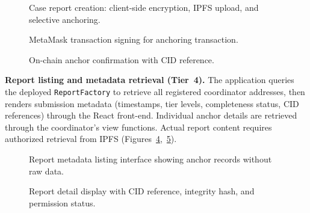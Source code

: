 \documentclass[AMA,LATO1COL]{WileyNJD-v2}
\begin{document}
\begin{figure}[!ht]
\centering
{}
\caption{Case report creation: client-side encryption, IPFS upload, and selective anchoring.}\label{fig:create1}
\end{figure}

\begin{figure}[!ht]
\centering
{}
\caption{MetaMask transaction signing for anchoring transaction.}\label{fig:create2}
\end{figure}

\begin{figure}[!ht]
\centering
{}
\caption{On-chain anchor confirmation with CID reference.}\label{fig:create3}
\end{figure}

\textbf{Report listing and metadata retrieval (Tier~4).} The application queries the deployed \texttt{ReportFactory} to retrieve all registered coordinator addresses, then renders submission metadata (timestamps, tier levels, completeness status, CID references) through the React front-end. Individual anchor details are retrieved through the coordinator's view functions. Actual report content requires authorized retrieval from IPFS (Figures~\ref{fig:list},~\ref{fig:detail}).

\begin{figure}[!ht]
\centering
{}
\caption{Report metadata listing interface showing anchor records without raw data.}\label{fig:list}
\end{figure}

\begin{figure}[!ht]
\centering
{}
\caption{Report detail display with CID reference, integrity hash, and permission status.}\label{fig:detail}
\end{figure}
\end{document}
